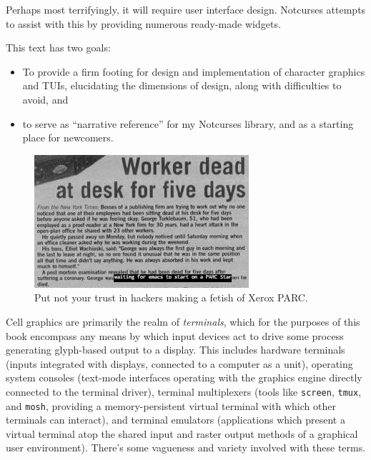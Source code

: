 \documentclass[letterpaper,10pt]{article}
\newenvironment{denseitemize}{
  \begin{itemize}
      \setlength{\itemsep}{0pt}
}{
  \end{itemize}
}
\begin{document}
Perhaps most terrifyingly, it will require user interface design. Notcurses
attempts to assist with this by providing numerous ready-made widgets.

\pagebreak

This text has two goals:
\begin{denseitemize}
\item{To provide a firm footing for design and implementation of character
    graphics and TUIs, elucidating the dimensions of design, along with difficulties
    to avoid, and}
\item{to serve as ``narrative reference'' for my Notcurses
      library, and as a starting place for newcomers.}
\end{denseitemize}

\begin{figure}[!htb]
\centering \includegraphics[width=.5\linewidth]{media/emacs-xerox.jpg}
  \caption{Put not your trust in hackers making a fetish of Xerox PARC.}
  \label{fig:xeroxemacs}
\end{figure}

Cell graphics are primarily the realm of \textit{terminals}, which for the
purposes of this book encompass any means by which input devices act to drive
some process generating glyph-based output to a display. This includes hardware
terminals (inputs integrated with displays, connected to a computer as a unit),
operating system consoles (text-mode interfaces operating with the graphics
engine directly connected to the terminal driver), terminal multiplexers (tools
like \texttt{screen}, \texttt{tmux}, and \texttt{mosh}, providing a
memory-persistent virtual terminal with which other terminals can interact),
and terminal emulators (applications which present a virtual terminal atop the
shared input and raster output methods of a graphical user environment).
There's some vagueness and variety involved with these terms.
\end{document}
